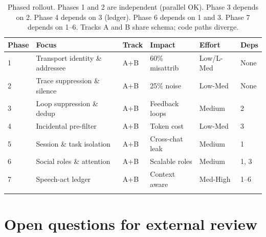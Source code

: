 \documentclass[11pt]{article}
\begin{document}
\begin{longtable}{llllll}
\toprule
Phase & Focus & Track & Impact & Effort & Deps \\
\midrule
1 & Transport identity \& addressee & A+B & 60\% misattrib & Low/L-Med & None \\
2 & Trace suppression \& silence & A+B & 25\% noise & Low-Med & None \\
3 & Loop suppression \& dedup & A+B & Feedback loops & Medium & 2 \\
4 & Incidental pre-filter & A+B & Token cost & Low-Med & 3 \\
5 & Session \& task isolation & A+B & Cross-chat leak & Medium & 1 \\
6 & Social roles \& attention & A+B & Scalable roles & Medium & 1, 3 \\
7 & Speech-act ledger & A+B & Context aware & Med-High & 1--6 \\
\bottomrule
\caption{Phased rollout.  Phases 1 and 2 are independent (parallel OK).
Phase 3 depends on 2.  Phase 4 depends on 3 (ledger).  Phase 6 depends on
1 and 3.  Phase 7 depends on 1--6.  Tracks A and B share schema; code paths
diverge.}
\end{longtable}

\section{Open questions for external review}
\end{document}
